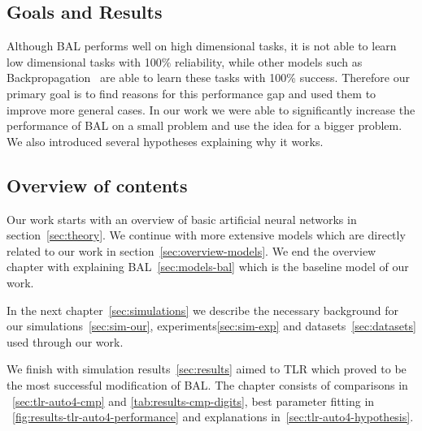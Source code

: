 


\subsection*{Goals and Results}
Although BAL performs well on high dimensional tasks, it is not able to learn low dimensional tasks with 100\% reliability, while other models such as Backpropagation~\citep{rumelhart1986learning} are able to learn these tasks with 100\% success. Therefore our primary goal is to find reasons for this performance gap and used them to improve more general cases. In our work we were able to significantly increase the performance of BAL on a small problem and use the idea for a bigger problem. We also introduced several hypotheses explaining why it works. 

\subsection*{Overview of contents}
Our work starts with an overview of basic artificial neural networks in section~\ref{sec:theory}. We continue with more extensive models which are directly related to our work in section~\ref{sec:overview-models}. We end the overview chapter with explaining BAL~\ref{sec:models-bal} which is the baseline model of our work. 

In the next chapter~\ref{sec:simulations} we describe the necessary background for our simulations~\ref{sec:sim-our}, experiments\ref{sec:sim-exp} and datasets~\ref{sec:datasets} used through our work.  

We finish with simulation results~\ref{sec:results} aimed to TLR which proved to be the most successful modification of BAL. The chapter consists of comparisons in ~\ref{sec:tlr-auto4-cmp} and \ref{tab:results-cmp-digits}, best parameter fitting in ~\ref{fig:results-tlr-auto4-performance} and explanations in~\ref{sec:tlr-auto4-hypothesis}. 





